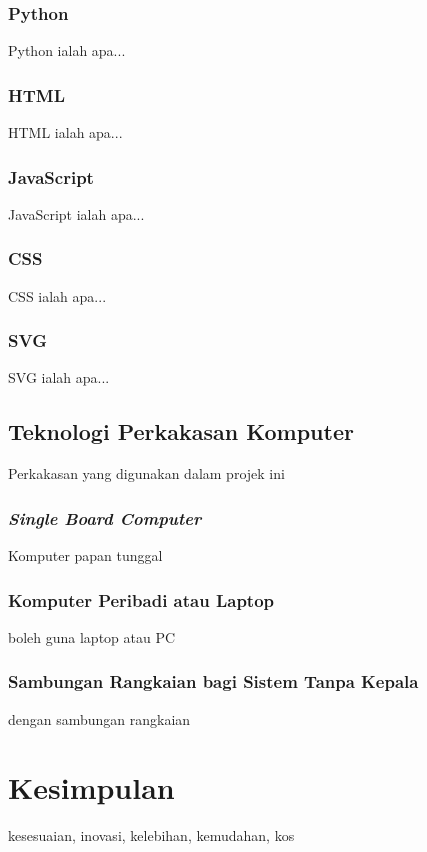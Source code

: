 \subsubsection{Python}
Python ialah apa...

\subsubsection{HTML}
HTML ialah apa...

\subsubsection{JavaScript}
JavaScript ialah apa...

\subsubsection{CSS}
CSS ialah apa...

\subsubsection{SVG}
SVG ialah apa...

\subsection{Teknologi Perkakasan Komputer}
Perkakasan yang digunakan dalam projek ini

\subsubsection{\textit{Single Board Computer}}
Komputer papan tunggal

\subsubsection{Komputer Peribadi atau Laptop}
boleh guna laptop atau PC

\subsubsection{Sambungan Rangkaian bagi Sistem Tanpa Kepala}
dengan sambungan rangkaian

\section{Kesimpulan}
kesesuaian, inovasi, kelebihan, kemudahan, kos
